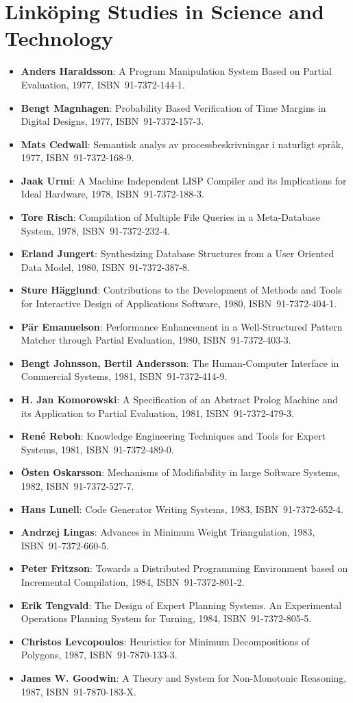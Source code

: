 \documentclass[a4paper,showtrims,twocolumn]{memoir}
\title{}
\newcommand{\adjustlayout}{
  \setlength{\trimtop}{\stockheight}
  \addtolength{\trimtop}{-\paperheight}
  \setlength{\trimedge}{\stockwidth}
  \addtolength{\trimedge}{-\paperwidth}
  \settrims{0.5\trimtop}{0.5\trimedge}
  \setlrmargins{*}{*}{1.5}
  \setulmargins{2cm}{*}{*}
}
\newcommand{\series}[1]{\section*{\footnotesize #1}}
\newenvironment{theses}{
  \begin{itemize}
    \setlength{\itemsep}{0.2em}
    \setlength{\parskip}{0em}
    \setlength{\parsep}{0em}
}{
  \end{itemize}
}
\newcommand{\thesis}[5]{\item[No. #1] \textbf{#2}: #3, #4, ISBN~#5.}
\begin{document}
  \adjustlayout
  \checkandfixthelayout
  \pagestyle{empty}
  \maketitle
  \thispagestyle{empty}
  \fontsize{6}{7}
  \selectfont
  \raggedright

  \series{Linköping Studies in Science and Technology}

  \begin{theses}
    \thesis{14}{Anders Haraldsson}{A Program Manipulation System Based on Partial Evaluation}{1977}{91-7372-144-1}
    \thesis{17}{Bengt Magnhagen}{Probability Based Verification of Time Margins in Digital Designs}{1977}{91-7372-157-3}
    \thesis{18}{Mats Cedwall}{Semantisk analys av processbeskrivningar i naturligt språk}{1977}{91-7372-168-9}
    \thesis{22}{Jaak Urmi}{A Machine Independent LISP Compiler and its Implications for Ideal Hardware}{1978}{91-7372-188-3}
    \thesis{33}{Tore Risch}{Compilation of Multiple File Queries in a Meta-Database System}{1978}{91-7372-232-4}
    \thesis{51}{Erland Jungert}{Synthesizing Database Structures from a User Oriented Data Model}{1980}{91-7372-387-8}
    \thesis{54}{Sture Hägglund}{Contributions to the Development of Methods and Tools for Interactive Design of Applications Software}{1980}{91-7372-404-1}
    \thesis{55}{Pär Emanuelson}{Performance Enhancement in a Well-Structured Pattern Matcher through Partial Evaluation}{1980}{91-7372-403-3}
    \thesis{58}{Bengt Johnsson, Bertil Andersson}{The Human-Computer Interface in Commercial Systems}{1981}{91-7372-414-9}
    \thesis{69}{H. Jan Komorowski}{A Specification of an Abstract Prolog Machine and its Application to Partial Evaluation}{1981}{91-7372-479-3}
    \thesis{71}{René Reboh}{Knowledge Engineering Techniques and Tools for Expert Systems}{1981}{91-7372-489-0}
    \thesis{77}{Östen Oskarsson}{Mechanisms of Modifiability in large Software Systems}{1982}{91-7372-527-7}
    \thesis{94}{Hans Lunell}{Code Generator Writing Systems}{1983}{91-7372-652-4}
    \thesis{97}{Andrzej Lingas}{Advances in Minimum Weight Triangulation}{1983}{91-7372-660-5}
    \thesis{109}{Peter Fritzson}{Towards a Distributed Programming Environment based on Incremental Compilation}{1984}{91-7372-801-2}
    \thesis{111}{Erik Tengvald}{The Design of Expert Planning Systems. An Experimental Operations Planning System for Turning}{1984}{91-7372-805-5}
    \thesis{155}{Christos Levcopoulos}{Heuristics for Minimum Decompositions of Polygons}{1987}{91-7870-133-3}
    \thesis{165}{James W. Goodwin}{A Theory and System for Non-Monotonic Reasoning}{1987}{91-7870-183-X}

\end{theses}
\end{document}
